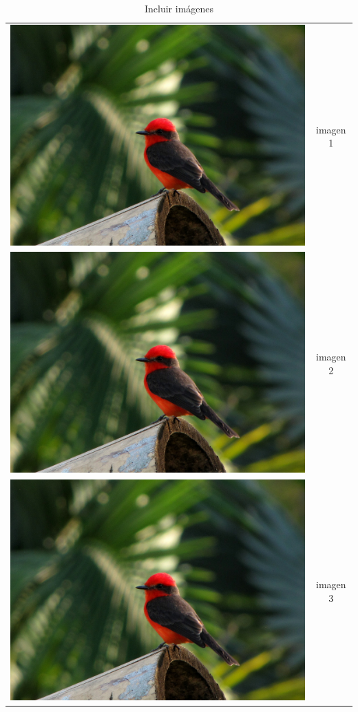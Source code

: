 \documentclass[12pt]{article}
\begin{document}
\begin{table}[!ht]
\centering
\begin{tabular}{||l|c||}
\includegraphics[scale=0.1]{figuras/Petirrojo2} & imagen 1 \\
\includegraphics[scale=0.1]{figuras/Petirrojo2} & imagen 2 \\
\includegraphics[scale=0.1]{figuras/Petirrojo2} & imagen 3 
\end{tabular}
\caption{Incluir imágenes}
\label{incuirimagen}
\end{table}
\end{document}
